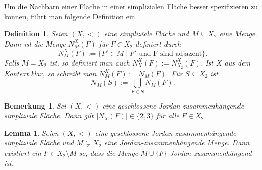 \documentclass[12pt,titlepage,twoside,cleardoublepage]{article}
\theoremstyle{nummermitklammern}
\newtheorem{lemma}[temp]{Lemma}
\newtheorem{definition}[temp]{Definition}
\newtheorem{bemerkung}[temp]{Bemerkung}
\newtheorem{definition}[zahl]{Definition}
\newtheorem{lemma}[zahl]{Lemma}
\newtheorem{bemerkung}[zahl]{Bemerkung}
\numberwithin{equation}{section}
\begin{document}
Um die Nachbarn einer Fläche in einer simplizialen Fläche besser spezifizieren zu können, führt man folgende Definition ein.
\begin{definition} 
Seien $(X,<)$ eine simpliziale Fläche und $M \subseteq X_2$ eine Menge. Dann ist die Menge $N_M^X(F)$  für $F \in X_2$ definiert durch
\[
N_M^X(F):=\{ F' \in M \mid F'\text{ und F sind adjazent}\}.
\]
Falls $M=X_2$ ist, so definiert man auch $N_X^X(F):=N^X_{X_2}(F)$. Ist $X$ aus dem Kontext klar, so schreibt man $N_M^X(F):=N_M(F)$.
Für $S \subseteq X_2$ ist 
\[
N_M(S):=\bigcup_{F\in S}N_M(F).
\]

\end{definition}
\begin{bemerkung}
Sei $(X,<)$ eine geschlossene Jordan-zusammenhängende simpliziale Fläche. Dann gilt $\vert N_X(F)\vert \in \{2,3\}$ für alle $F\in X_2$.
\end{bemerkung}
\begin{lemma} \label{lemma1} 
Seien $(X,<)$  eine geschlossene Jordan-zusammenhängende simpliziale Fläche und $M \subsetneq X_2$ eine Jordan-zusammenhängende Menge. Dann existiert ein $F\in X_2\setminus M$ so, dass die Menge $M \cup \{F\}$ Jordan-zusammenhängend ist.
\end{lemma}
\end{document}
